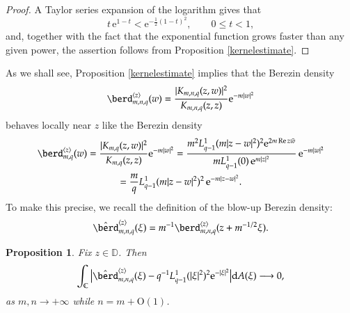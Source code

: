 \documentclass{birkart}
\newtheorem{prop}[thm]{Proposition}
\theoremstyle{definition}
\theoremstyle{remark}
\numberwithin{equation}{section}
\numberwithin{figure}{section}
\newcommand{\e}{\mathrm e}
\newcommand{\1}{{\mathbf 1}}
\newcommand{\Rpar}{q}
\newcommand{\D}{{\mathbb D}}
\newcommand{\Ordo}{\mathrm{O}}
\newcommand{\re}{\operatorname{Re}}
\newcommand{\diff}{{\mathrm d}}
\begin{document}
\begin{proof}
A Taylor series expansion of the logarithm gives that
\[
t\,\e^{1-t}<\e^{-\frac12(1-t)^2},\qquad 0\le t<1,
\] 
and, together with the fact that the exponential function grows faster than
any given power, the assertion follows from Proposition \ref{kernelestimate}. 
\end{proof}

As we shall see, Proposition \ref{kernelestimate} implies that the Berezin 
density 
\[
\berd^{\langle z\rangle}_{m,n,\Rpar}(w)= 
\frac{|K_{m,n,\Rpar}(z,w)|^2 }{K_{m,n,\Rpar}(z,z)}\e^{-m|w|^2}
\] 
behaves locally near $z$ like the Berezin density 
\begin{multline}
\label{eq-interm3}
\berd^{\langle z\rangle}_{m,\Rpar}(w)= 
\frac{| K_{m,\Rpar}(z,w)|^2 }{K_{m,\Rpar}(z,z)}\e^{-m|w|^2}=
\frac{m^2L^1_{\Rpar-1}(m|z-w|^2)^2\e^{2m\re z\bar w}}
{mL^1_{q-1}(0)\,\e^{m|z|^2}}\,\e^{-m|w|^2}
\\
=\frac{m}{\Rpar}L^1_{\Rpar-1}(m|z-w|^2)^2\,\e^{-m|z-w|^2}.
\end{multline}
To make this precise, we recall the definition of the blow-up Berezin density: 
\[
\hat{\berd}^{\langle z\rangle}_{m,n,\Rpar}(\xi) = 
m^{-1}\berd^{\langle z\rangle}_{m,n,\Rpar}(z+m^{-1/2}\xi).
\]

\begin{prop}
\label{prop-berconv}
Fix $z\in\D$. Then 
\[
\int_{\mathbb{C}} \big|\hat{\berd}^{\langle z\rangle}_{m,n,\Rpar}(\xi)- 
\Rpar^{-1}L^{1}_{\Rpar-1}(|\xi|^2)^2\e^{-|\xi|^2} \big| \diff A(\xi) 
\longrightarrow 0,
\]
as $m,n\to+\infty$ while $n=m+\Ordo(1)$.
\end{prop}
\end{document}
